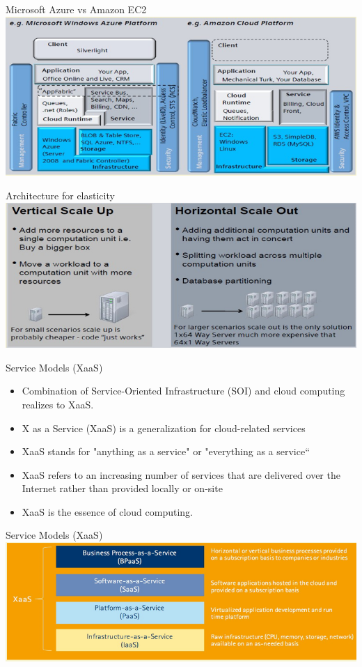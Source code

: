 \documentclass{SKP-beamer}
\begin{document}
\begin{frame}{Microsoft Azure vs Amazon EC2}
	\includegraphics[scale=0.8]{i.png}
\end{frame}

\begin{frame}{Architecture for elasticity}
	\includegraphics[scale=0.7]{j.png}
\end{frame}

\begin{frame}{Service Models (XaaS)}
	\begin{itemize}
		\item Combination of Service-Oriented Infrastructure (SOI) and cloud computing realizes to XaaS.
		\item X as a Service (XaaS) is a generalization for cloud-related services
		\item XaaS stands for "anything as a service" or "everything as a service“
		\item XaaS refers to an increasing number of services that are delivered over the Internet rather than provided locally or on-site
		\item XaaS is the essence of cloud computing.
	\end{itemize}
\end{frame}

\begin{frame}{Service Models (XaaS)}
	\includegraphics[scale=0.6]{k.png}
\end{frame}
\end{document}
